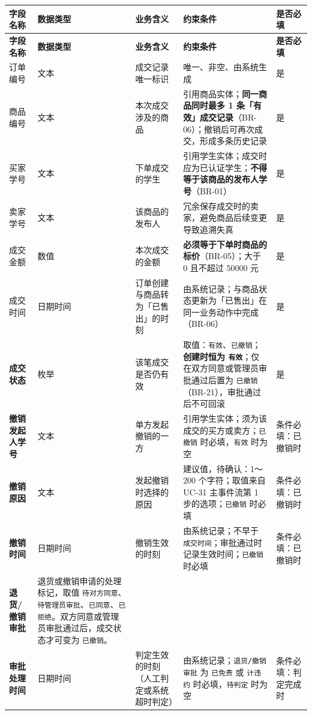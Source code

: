 \documentclass[12pt,a4paper]{ctexart}
\begin{document}
{\scriptsize
\begin{longtable}{|p{1.51cm}|p{5.58cm}|p{2.44cm}|p{4.96cm}|p{1.51cm}|}
\hline
\textbf{字段名称} & \textbf{数据类型} & \textbf{业务含义} & \textbf{约束条件} & \textbf{是否必填} \\
\hline
\endfirsthead
\hline
\textbf{字段名称} & \textbf{数据类型} & \textbf{业务含义} & \textbf{约束条件} & \textbf{是否必填} \\
\hline
\endhead
\hline
\endfoot
订单编号 & 文本 & 成交记录唯一标识 & 唯一、非空、由系统生成 & 是 \\
\hline
商品编号 & 文本 & 本次成交涉及的商品 & 引用商品实体；\textbf{同一商品同时最多 1 条「有效」成交记录}（BR-06）；撤销后可再次成交，形成多条历史记录 & 是 \\
\hline
买家学号 & 文本 & 下单成交的学生 & 引用学生实体；成交时应为已认证学生；\textbf{不得等于该商品的发布人学号}（BR-01） & 是 \\
\hline
卖家学号 & 文本 & 该商品的发布人 & 冗余保存成交时的卖家，避免商品后续变更导致追溯失真 & 是 \\
\hline
成交金额 & 数值 & 本次成交的金额 & \textbf{必须等于下单时商品的标价}（BR-05）；大于 0 且不超过 50000 元 & 是 \\
\hline
成交时间 & 日期时间 & 订单创建与商品转为「已售出」的时刻 & 由系统记录；与商品状态更新为「已售出」在同一业务动作中完成（BR-06） & 是 \\
\hline
\textbf{成交状态} & 枚举 & 该笔成交是否仍有效 & 取值：\texttt{有效}、\texttt{已撤销}；\textbf{创建时恒为 \texttt{有效}}；仅在双方同意或管理员审批通过后置为 \texttt{已撤销}（BR-21），审批通过后不可回滚 & 是 \\
\hline
\textbf{撤销发起人学号} & 文本 & 单方发起撤销的一方 & 引用学生实体；须为该成交的买方或卖方；\texttt{已撤销} 时必填，\texttt{有效} 时为空 & 条件必填：已撤销时 \\
\hline
\textbf{撤销原因} & 文本 & 发起撤销时选择的原因 & 建议值，待确认：1～200 个字符；取值来自 UC-31 主事件流第 1 步的选项；\texttt{已撤销} 时必填 & 条件必填：已撤销时 \\
\hline
\textbf{撤销时间} & 日期时间 & 撤销生效的时刻 & 由系统记录；不早于 \texttt{成交时间}；审批通过时记录生效时间；\texttt{已撤销} 时必填 & 条件必填：已撤销时 \\
\hline
\textbf{退货/撤销审批} & 退货或撤销申请的处理标记，取值 \texttt{待对方同意}、\texttt{待管理员审批}、\texttt{已同意}、\texttt{已拒绝}。双方同意或管理员审批通过后，成交状态才可变为 \texttt{已撤销}。 &  &  &  \\
\hline
\textbf{审批处理时间} & 日期时间 & 判定生效的时刻（人工判定或系统超时判定） & 由系统记录；\texttt{退货/撤销审批} 为 \texttt{已免责} 或 \texttt{计违约} 时必填，\texttt{待判定} 时为空 & 条件必填：判定完成时 \\
\hline
\end{longtable}
}
\end{document}
